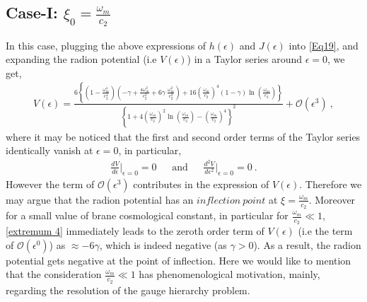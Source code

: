 \documentclass{article}
\begin{document}
\subsection*{Case-I: $\xi_\mathrm{0} = \frac{\omega_m}{c_2}$} 
 In this case, plugging the above expressions of $h(\epsilon)$ and 
 $J(\epsilon)$ into \ref{Eq19}, and expanding the radion potential (i.e $V(\epsilon)$) in a Taylor series around $\epsilon = 0$, we get,
 \begin{eqnarray}
  V(\epsilon) = \frac{6\left\{\left(1-\frac{\omega_m^4}{c_2^4}\right)\left(-\gamma + \frac{4\omega_m^2}{c_2^2} + 6\gamma~\frac{\omega_m^2}{c_2^2}\right) 
  + 16\left(\frac{\omega_m}{c_2}\right)^4(1-\gamma)\ln{\left(\frac{\omega_m}{c_2}\right)}\right\}}
  {\left\{1 + 4\left(\frac{\omega_m}{c_2}\right)^2\ln{\left(\frac{\omega_m}{c_2}\right)} - \left(\frac{\omega_m}{c_2}\right)^4\right\}^2} 
  + \mathcal{O}\left(\epsilon^3\right)~,
  \label{extremum 4}
 \end{eqnarray}
where it may be noticed that the first and second order terms of the Taylor series identically vanish at $\epsilon=0$, in particular,
\begin{eqnarray}
 \frac{dV}{d\epsilon}\bigg|_{\epsilon = 0} = 0~~~~~~~\mathrm{and}~~~~~~~\frac{d^2V}{d\epsilon^2}\bigg|_{\epsilon = 0} = 0~.\nonumber
\end{eqnarray}
 However the term of $\mathcal{O}\left(\epsilon^3\right)$ contributes in the expression of $V(\epsilon)$. Therefore we may argue that the radion potential 
 has an $inflection~point$ at $\xi = \frac{\omega_m}{c_2}$. Moreover for a small value of brane cosmological constant, in particular for 
 $\frac{\omega_m}{c_2} \ll 1$, \ref{extremum 4} immediately leads to the zeroth order term of $V(\epsilon)$ 
 (i.e the term of $\mathcal{O}\left(\epsilon^0\right)$) as $\approx -6\gamma$, which is indeed negative (as $\gamma > 0$). As a result, 
 the radion potential gets negative at the point of inflection. Here we would like to mention that the consideration 
 $\frac{\omega_m}{c_2} \ll 1$ has phenomenological motivation, mainly, regarding the resolution of the gauge hierarchy problem. 

 
 

 
 
 
 
\end{document}
